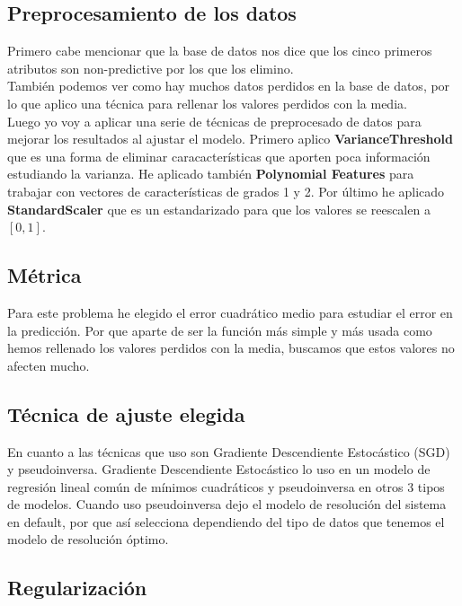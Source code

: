 \documentclass[a4paper,11pt]{article}
\begin{document}
\subsection{Preprocesamiento de los datos}

Primero cabe mencionar que la base de datos nos dice que los cinco primeros atributos son non-predictive por los que los elimino.\\

También podemos ver como hay muchos datos perdidos en la base de datos, por lo que aplico una técnica para rellenar los valores perdidos con la media.\\

Luego yo voy a aplicar una serie de técnicas de preprocesado de datos para mejorar los resultados al ajustar el modelo. Primero aplico \textbf{VarianceThreshold} que es una forma de eliminar caracacterísticas que aporten poca información estudiando la varianza. He aplicado también \textbf{Polynomial Features} para trabajar con vectores de características de grados 1 y 2. Por último he aplicado \textbf{StandardScaler} que es un estandarizado para que los valores se reescalen a $[0,1]$.

\subsection{Métrica}

Para este problema he elegido el error cuadrático medio para estudiar el error en la predicción. Por que aparte de ser la función más simple y más usada como hemos rellenado los valores perdidos con la media, buscamos que estos valores no afecten mucho.

\subsection{Técnica de ajuste elegida}

En cuanto a las técnicas que uso son Gradiente Descendiente Estocástico (SGD) y pseudoinversa. Gradiente Descendiente Estocástico lo uso en un modelo de regresión lineal común de mínimos cuadráticos y pseudoinversa en otros 3 tipos de modelos. Cuando uso pseudoinversa dejo el modelo de resolución del sistema en default, por que así selecciona dependiendo del tipo de datos que tenemos el modelo de resolución óptimo. 

\subsection{Regularización}
\end{document}
